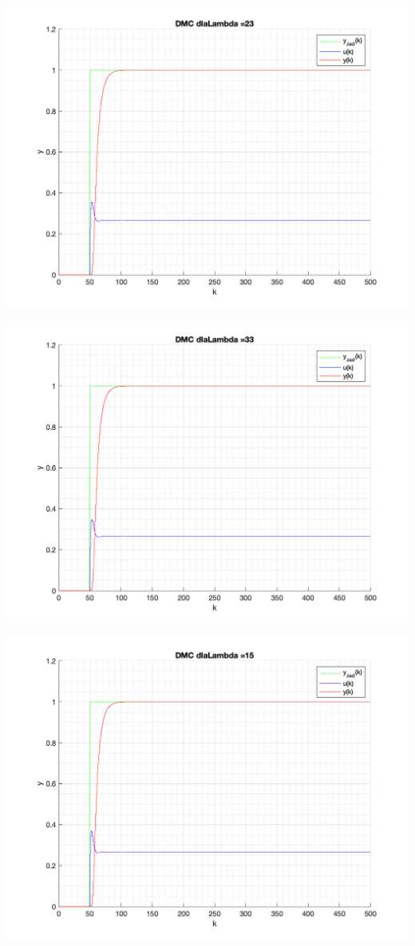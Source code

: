 \documentclass[a4paper, 11pt]{article}
\begin{document}
\begin{enumerate}
 \includegraphics[width=\linewidth]{./ModelsP4_Lambda/P4_DMC_Lambda_23_png.png} 
 
 \includegraphics[width=\linewidth]{./ModelsP4_Lambda/P4_DMC_Lambda_33_png.png} 
 
 \includegraphics[width=\linewidth]{./ModelsP4_Lambda/P4_DMC_Lambda_15_png.png} 
 

\end{enumerate}
\end{document}
